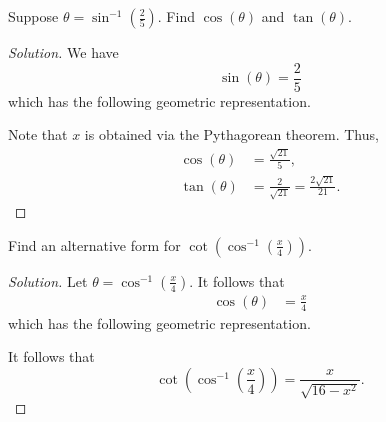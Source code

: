 \documentclass[compacto,10pt,comentarios]{aleph-notas}
\begin{document}
\begin{ejer}
    Suppose $\theta = \sin^{-1} \left( \frac{2}{5} \right)$. Find $\cos(\theta)$ and $\tan(\theta)$.
\end{ejer}
\begin{proof}[Solution]
    We have
    $$
    \sin(\theta) = \frac{2}{5}
    $$
    which has the following geometric representation.
    \begin{center}
    \end{center}
    Note that $x$ is obtained via the Pythagorean theorem. Thus,
    \begin{align*}
        \cos(\theta) & = \frac{\sqrt{21}}{5}, \\
        \tan(\theta) & = \frac{2}{\sqrt{21}} = \frac{2\sqrt{21}}{21} .
    \end{align*}
\end{proof}

\begin{ejer}
    Find an alternative form for $\cot\left( \cos^{-1} \left( \frac{x}{4} \right) \right)$.
\end{ejer}
\begin{proof}[Solution]
    Let $\theta = \cos^{-1} \left( \frac{x}{4} \right)$. It follows that
    \begin{align*}
        \cos(\theta) & = \frac{x}{4}
    \end{align*}
    which has the following geometric representation.
    \begin{center}
    \end{center}
    It follows that
    $$
    \cot \left( \cos^{-1} \left( \frac{x}{4} \right) \right) = \frac{x}{\sqrt{16 - x^2}}.
    $$
\end{proof}
\end{document}
